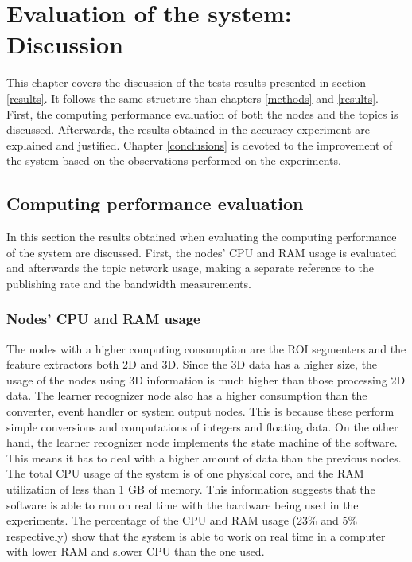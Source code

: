 \chapter{Evaluation of the system: Discussion}
\label{discussion}

This chapter covers the discussion of the tests results presented in section \ref{results}.
It follows the same structure than chapters \ref{methods} and \ref{results}. 
First, the computing performance evaluation of both the nodes and the topics is discussed. 
Afterwards, the results obtained in the accuracy experiment are explained and justified. 
Chapter \ref{conclusions} is devoted to the improvement of the system based on the observations performed on the experiments. 

\section{Computing performance evaluation}
In this section the results obtained when evaluating the computing performance of the system are discussed. 
First, the nodes' CPU and RAM usage is evaluated and afterwards the topic network usage, making a separate reference to the publishing rate and the bandwidth measurements. 

	\subsection{Nodes' CPU and RAM usage}

			The nodes with a higher computing consumption are the ROI segmenters and the feature extractors both 2D and 3D. 
			Since the 3D data has a higher size, the usage of the nodes using 3D information is much higher than those processing 2D data. 
			The learner recognizer node also has a higher consumption than the converter, event handler or system output nodes. 
			This is because these perform simple conversions and computations of integers and floating data. 
			On the other hand, the learner recognizer node implements the state machine of the software. 
			This means it has to deal with a higher amount of data than the previous nodes. 
			\\

			The total CPU usage of the system is of one physical core, and the RAM utilization of less than 1 GB of memory. 
			This information suggests that the software is able to run on real time with the hardware being used in the experiments. 
			The percentage of the CPU and RAM usage (23\% and 5\% respectively) show that the system is able to work on real time in a computer with lower RAM and slower CPU than the one used. 


